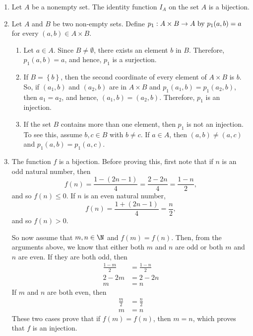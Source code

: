 \begin{enumerate}
\item Let $A$ be a nonempty set.  The identity function $I_A$ on the set $A$ is a bijection.

\item Let  $A$  and  $B$  be two non-empty sets.  Define  
$p_1 :A \times B \to A \text{ by }  \\
p_1 ( {a, b} ) = a$ for every  
$( {a, b} ) \in A \times B$.

\begin{enumerate}
\item Let $a \in A$.  Since $B \ne \emptyset$, there exists an element $b$ in $B$.  Therefore, 
$p_1 ( a, b ) = a$, and hence, $p_1$ is a surjection.

\item If $B = \left\{ b \right\}$, then the second coordinate of every element of $A \times B$ is $b$.  So, if $( a_1, b )$ and $( a_2, b )$ are in $A \times B$ and 
$p_1 ( {a_1, b} ) = p_1 ( {a_2, b} )$, then $a_1 = a_2$, and hence,
$( a_1, b ) = ( a_2, b )$.  Therefore, $p_1$ is an injection.

\item If the set $B$ contains more than one element, then $p_1$ is not an injection.  To see this, assume $b, c \in B$ with $b \ne c$.  If $a \in A$, then 
$( a, b ) \ne ( a, c )$ and 
$p_1 ( a, b ) = p_1 ( a, c )$.
\end{enumerate}


\item The function $f$ is a bijection.  Before proving this, first note that if $n$ is an odd natural number, then
\[
f(n) = \frac{1 - (2n - 1)}{4} = \frac{2 - 2n}{4} = \frac{1 - n}{2},
\]
and so $f(n) \leq 0$.  If $n$ is an even natural number, 
\[
f(n) = \frac{1 + (2n - 1)}{4} = \frac{n}{2},
\]
and so $f(n) > 0$.

\noindent
So now assume that $m, n \in \N$ and $f(m) = f(n)$.  Then, from the arguments above, we know that either both $m$ and $n$ are odd or both $m$ and $n$ are even.  If they are both odd, then
\begin{align*}
\frac{1 - m}{2} &= \frac{1 - n}{2} \\
2 - 2m &= 2 - 2n \\
m &= n
\end{align*}
If $m$ and $n$ are both even, then
\begin{align*}
\frac{m}{2} &= \frac{n}{2} \\
m &= n
\end{align*}
These two cases prove that if $f(m) = f(n)$, then $m = n$, which proves that $f$ is an injection.


\end{enumerate}

